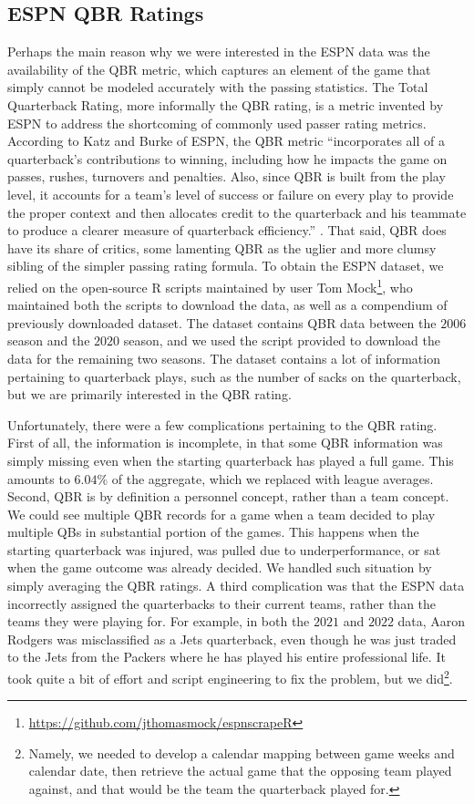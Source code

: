 \documentclass[10pt]{article}
\begin{document}
\subsection{ESPN QBR Ratings}

Perhaps the main reason why we were interested in the ESPN data was the
availability of the QBR metric, which captures an element of the game that simply cannot be
modeled accurately with the passing statistics.
The Total Quarterback Rating, more informally the QBR rating, is 
a metric invented by ESPN to address the shortcoming of commonly
used passer rating metrics. According to Katz and Burke of ESPN,
the QBR metric ``incorporates all of a quarterback’s contributions to winning,
including how he impacts the game on passes, rushes, turnovers and penalties. Also,
since QBR is built from the play level,
it accounts for a team’s level of success or failure on every play to provide the
proper context and then allocates credit to the quarterback and his teammate to
produce a clearer measure of quarterback efficiency.'' \cite{espn2016}. That said,
QBR does have its share of critics, some lamenting QBR as the uglier and more
clumsy sibling of the simpler passing rating formula. To obtain the ESPN dataset, we
relied on the open-source R scripts maintained by user Tom Mock\footnote{
\url{https://github.com/jthomasmock/espnscrapeR}}, who maintained both the scripts to
download the data, as well as a compendium of previously downloaded dataset. The dataset
contains QBR data between the $2006$ season and the $2020$ season, and we
used the script provided to download the data
for the remaining two seasons. The dataset contains a lot of information pertaining
to quarterback plays, such as the number of sacks on the quarterback, but we are primarily
interested in the QBR rating.

Unfortunately, there were a few complications pertaining to the QBR rating. First of all,
the information is incomplete, in that some QBR information was simply missing even when
the starting quarterback has played a full game. This amounts to
$6.04\%$ of the aggregate, which we replaced with league averages.
Second, QBR is by definition a personnel concept, rather than a team concept. We could see
multiple QBR records for a game when a team decided to play multiple QBs in substantial
portion of the games. This happens when the starting quarterback was injured, was pulled
due to underperformance, or sat when the game outcome was already decided. We handled
such situation by simply averaging the QBR ratings. A third complication was that the ESPN
data incorrectly assigned the quarterbacks to their current teams, rather than the teams
they were playing for. For example, in both the $2021$ and $2022$ data, Aaron Rodgers was
misclassified as a Jets quarterback, even though he was just traded to the Jets from
the Packers where he has played his entire professional life. It took quite a bit of
effort and script engineering to fix the problem, but we did\footnote{Namely, we
needed to develop a calendar mapping between game weeks and calendar date, then retrieve
the actual game that the opposing team played against, and that would be the team the
quarterback played for.}.
\end{document}
